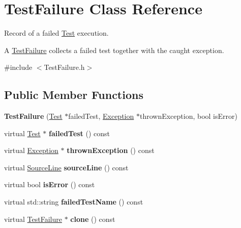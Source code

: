 \hypertarget{class_test_failure}{}\section{Test\+Failure Class Reference}
\label{class_test_failure}


Record of a failed \hyperlink{class_test}{Test} execution.

A \hyperlink{class_test_failure}{Test\+Failure} collects a failed test together with the caught exception.  




{\ttfamily \#include $<$Test\+Failure.\+h$>$}

\subsection*{Public Member Functions}
\begin{DoxyCompactItemize}
\item 
{\bfseries Test\+Failure} (\hyperlink{class_test}{Test} $\ast$failed\+Test, \hyperlink{class_exception}{Exception} $\ast$thrown\+Exception, bool is\+Error)\hypertarget{class_test_failure_a0ecf7ad4ab673974d30d10ffb2b01790}{}\label{class_test_failure_a0ecf7ad4ab673974d30d10ffb2b01790}

\item 
virtual \hyperlink{class_test}{Test} $\ast$ {\bfseries failed\+Test} () const \hypertarget{class_test_failure_a35aa1b953feff8635c832a53d3c6946d}{}\label{class_test_failure_a35aa1b953feff8635c832a53d3c6946d}

\item 
virtual \hyperlink{class_exception}{Exception} $\ast$ {\bfseries thrown\+Exception} () const \hypertarget{class_test_failure_a8e60e0c1ea068bef6c546d20d8260400}{}\label{class_test_failure_a8e60e0c1ea068bef6c546d20d8260400}

\item 
virtual \hyperlink{class_source_line}{Source\+Line} {\bfseries source\+Line} () const \hypertarget{class_test_failure_aa3c6a076dca224d7e440212cfd127305}{}\label{class_test_failure_aa3c6a076dca224d7e440212cfd127305}

\item 
virtual bool {\bfseries is\+Error} () const \hypertarget{class_test_failure_a23b25cf3452b3ab7dc84c70664f13ff0}{}\label{class_test_failure_a23b25cf3452b3ab7dc84c70664f13ff0}

\item 
virtual std\+::string {\bfseries failed\+Test\+Name} () const \hypertarget{class_test_failure_aca471a29c01d3c5e4d439aadbb1825bf}{}\label{class_test_failure_aca471a29c01d3c5e4d439aadbb1825bf}

\item 
virtual \hyperlink{class_test_failure}{Test\+Failure} $\ast$ {\bfseries clone} () const \hypertarget{class_test_failure_a0f0c86f12431ea8adde3e70e0cb52db7}{}\label{class_test_failure_a0f0c86f12431ea8adde3e70e0cb52db7}

\end{DoxyCompactItemize}
